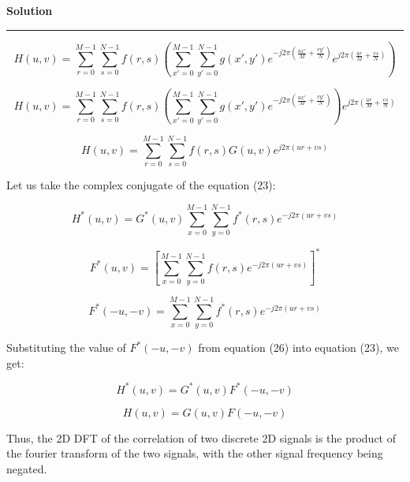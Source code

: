 \documentclass[a4paper]{article}
\newenvironment{solution}[2][]{%
    \begin{mdframed}[linecolor=green!60!black, linewidth=2pt, roundcorner=10pt, backgroundcolor=green!5!white, skipabove=12pt, skipbelow=12pt]%
        \textbf{\large #2} %
        \par\noindent\rule{\textwidth}{0.4pt} %
        \vspace{0.5em} %
}{%
    \end{mdframed}%
}
\begin{document}
\begin{solution}{Solution}
\begin{equation}
    H(u, v) = \sum_{r = 0}^{M-1} \sum_{s = 0}^{N-1} f(r, s)\left( \sum_{x' = 0}^{M-1} \sum_{y' = 0}^{N-1} g(x', y') e^{-j2\pi(\frac{ux'}{M}+\frac{vy'}{N})} e^{j2\pi(\frac{ur}{M}+\frac{vs}{N})}\right)
\end{equation}

\begin{equation}
    H(u, v) = \sum_{r = 0}^{M-1} \sum_{s = 0}^{N-1} f(r, s)\left( \sum_{x' = 0}^{M-1} \sum_{y' = 0}^{N-1} g(x', y') e^{-j2\pi(\frac{ux'}{M}+\frac{vy'}{N})}\right) e^{j2\pi(\frac{ur}{M}+\frac{vs}{N})}
\end{equation}

\begin{equation}
    H(u, v) = \sum_{r = 0}^{M-1} \sum_{s = 0}^{N-1} f(r, s) G(u,v) e^{j2\pi(ur+vs)}
\end{equation}


Let us take the complex conjugate of the equation (23):

\begin{equation}
    H^*(u, v) = G^*(u,v) \sum_{x = 0}^{M-1} \sum_{y = 0}^{N-1} f^*(r, s)  e^{-j2\pi(ur+vs)}
\end{equation}

\begin{equation}
    F^*(u, v) = [\sum_{x = 0}^{M-1} \sum_{y = 0}^{N-1} f(r, s)  e^{-j2\pi(ur+vs)}]^*
\end{equation}

\begin{equation}
    F^*(-u, -v) = \sum_{x = 0}^{M-1} \sum_{y = 0}^{N-1} f^*(r, s)  e^{-j2\pi(ur+vs)}
\end{equation}

Substituting the value of $F^*(-u, -v)$ from equation (26) into equation (23), we get:

\begin{equation}
    H^*(u, v) = G^*(u,v) F^*(-u, -v)
\end{equation}

\begin{equation}
    H(u, v) = G(u,v) F(-u, -v)
\end{equation}

Thus, the 2D DFT of the correlation of two discrete 2D signals is the product of the fourier transform of the two signals, with the other signal frequency being negated.

\end{solution}
\end{document}
